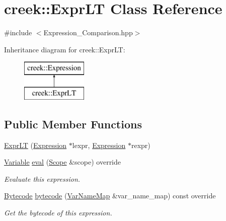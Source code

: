 \hypertarget{classcreek_1_1_expr_l_t}{}\section{creek\+:\+:Expr\+LT Class Reference}
\label{classcreek_1_1_expr_l_t}


{\ttfamily \#include $<$Expression\+\_\+\+Comparison.\+hpp$>$}

Inheritance diagram for creek\+:\+:Expr\+LT\+:\begin{figure}[H]
\begin{center}
\leavevmode
\includegraphics[height=2.000000cm]{classcreek_1_1_expr_l_t}
\end{center}
\end{figure}
\subsection*{Public Member Functions}
\begin{DoxyCompactItemize}
\item 
\hyperlink{classcreek_1_1_expr_l_t_ae534ef142398ed9eaf07c9b6351b49df}{Expr\+LT} (\hyperlink{classcreek_1_1_expression}{Expression} $\ast$lexpr, \hyperlink{classcreek_1_1_expression}{Expression} $\ast$rexpr)
\item 
\hyperlink{classcreek_1_1_variable}{Variable} \hyperlink{classcreek_1_1_expr_l_t_a3a06f97fcdcc60b8e48c2649ac73b0ac}{eval} (\hyperlink{classcreek_1_1_scope}{Scope} \&scope) override
\begin{DoxyCompactList}\small\item\em Evaluate this expression. \end{DoxyCompactList}\item 
\hyperlink{classcreek_1_1_bytecode}{Bytecode} \hyperlink{classcreek_1_1_expr_l_t_a3a28c50d6cae2721efcd3d8388a57721}{bytecode} (\hyperlink{classcreek_1_1_var_name_map}{Var\+Name\+Map} \&var\+\_\+name\+\_\+map) const  override\hypertarget{classcreek_1_1_expr_l_t_a3a28c50d6cae2721efcd3d8388a57721}{}\label{classcreek_1_1_expr_l_t_a3a28c50d6cae2721efcd3d8388a57721}

\begin{DoxyCompactList}\small\item\em Get the bytecode of this expression. \end{DoxyCompactList}\end{DoxyCompactItemize}


